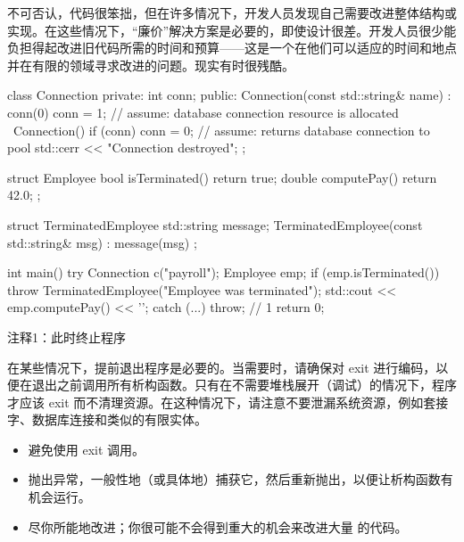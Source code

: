 不可否认，代码很笨拙，但在许多情况下，开发人员发现自己需要改进整体结构或实现。在这些情况下，“廉价”解决方案是必要的，即使设计很差。开发人员很少能负担得起改进旧代码所需的时间和预算——这是一个在他们可以适应的时间和地点并在有限的领域寻求改进的问题。现实有时很残酷。


\begin{cpp}
class Connection {
private:
  int conn;
public:
  Connection(const std::string& name) : conn(0) {
    conn = 1; // assume: database connection resource is allocated
  }
  ~Connection() {
    if (conn)
      conn = 0; // assume: returns database connection to pool
    std::cerr << "Connection destroyed\n";
  }
};

struct Employee {
  bool isTerminated() { return true; }
  double computePay() { return 42.0; }
};

struct TerminatedEmployee {
  std::string message;
  TerminatedEmployee(const std::string& msg) : message(msg) {}
};

int main() {
  try {
    Connection c("payroll");
    Employee emp;
    if (emp.isTerminated())
    throw TerminatedEmployee("Employee was terminated");
    std::cout << emp.computePay() << '\n';
  } catch (...) {
    throw; // 1
  }
  return 0;
}
\end{cpp}

{\footnotesize
注释1：此时终止程序
}

在某些情况下，提前退出程序是必要的。当需要时，请确保对 exit 进行编码，以便在退出之前调用所有析构函数。只有在不需要堆栈展开（调试）的情况下，程序才应该 exit 而不清理资源。在这种情况下，请注意不要泄漏系统资源，例如套接字、数据库连接和类似的有限实体。


\begin{itemize}
\item
避免使用 exit 调用。

\item
抛出异常，一般性地（或具体地）捕获它，然后重新抛出，以便让析构函数有机会运行。

\item
尽你所能地改进；你很可能不会得到重大的机会来改进大量 的代码。
\end{itemize}









